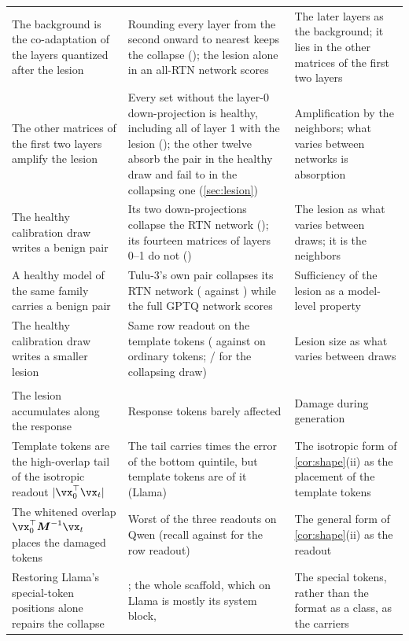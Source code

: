 \begin{center}
\begin{longtable}{>{\raggedright\arraybackslash}p{4.2cm}>{\raggedright\arraybackslash}p{5.2cm}>{\raggedright\arraybackslash}p{3.6cm}}
The background is the co-adaptation of the layers quantized after the lesion & Rounding every layer from the second onward to nearest keeps the collapse (\RtnTailRange{}); the lesion alone in an all-RTN network scores \TPrtn{} & The later layers as the background; it lies in the other matrices of the first two layers \\
The other matrices of the first two layers amplify the lesion & Every set without the layer-0 down-projection is healthy, including all of layer 1 with the lesion (\LoneWholeIF{}); the other twelve absorb the pair in the healthy draw and fail to in the collapsing one (\cref{sec:lesion}) & Amplification by the neighbors; what varies between networks is absorption \\
The healthy calibration draw writes a benign pair & Its two down-projections collapse the RTN network (\LseedOnePairIF{}); its fourteen matrices of layers 0--1 do not (\LseedOneFourteenIF{}) & The lesion as what varies between draws; it is the neighbors \\
A healthy model of the same family carries a benign pair & Tulu-3's own pair collapses its RTN network (\TuluPairIF{} against \TuluRtnIF{}) while the full GPTQ network scores \TuluGptqIF{} & Sufficiency of the lesion as a model-level property \\
The healthy calibration draw writes a smaller lesion & Same row readout on the template tokens (\SeedOneRowTpl{} against \SeedOneRowOrd{} on ordinary tokens; \SeedZeroRowTpl{}/\SeedZeroRowOrd{} for the collapsing draw) & Lesion size as what varies between draws \\
\addlinespace[3pt]\multicolumn{3}{l}{\emph{The readout and the direction}} \\\addlinespace[1pt]
The lesion accumulates along the response & Response tokens barely affected & Damage during generation \\
Template tokens are the high-overlap tail of the isotropic readout $|\vx_0^\top\vx_t|$ & The tail carries \LoverlapRatio{} times the error of the bottom quintile, but template tokens are \LoverlapTplTop{} of it (Llama) & The isotropic form of \cref{cor:shape}(ii) as the placement of the template tokens \\
The whitened overlap $\vx_0^\top\mM^{-1}\vx_t$ places the damaged tokens & Worst of the three readouts on Qwen (recall \WhiteRecall{} against \RowRecall{} for the row readout) & The general form of \cref{cor:shape}(ii) as the readout \\
Restoring Llama's special-token positions alone repairs the collapse & \PatchTpl{}; the whole scaffold, which on Llama is mostly its system block, \PatchScaf{} & The special tokens, rather than the format as a class, as the carriers \\

\end{longtable}
\end{center}
